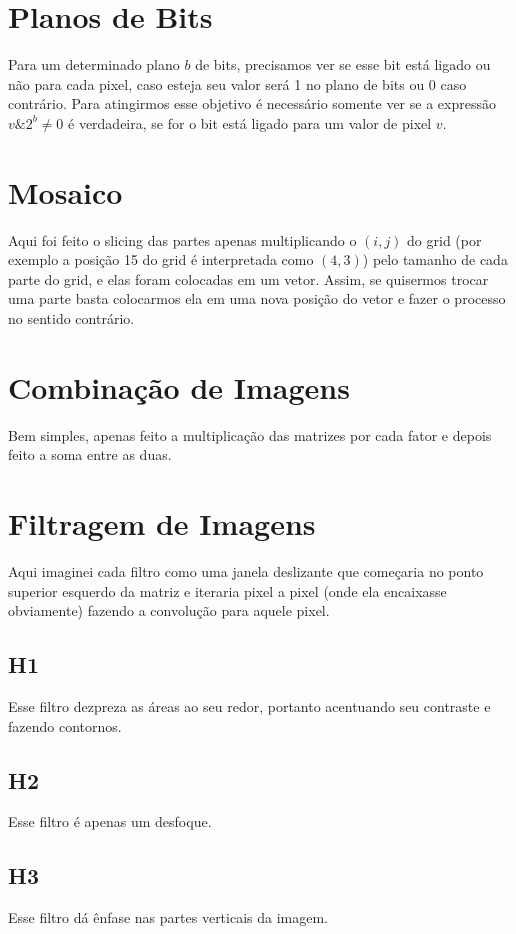 \documentclass[12pt, letterpaper]{article}
\begin{document}
\section{Planos de Bits}
	Para um determinado plano $b$ de bits, precisamos ver se esse bit está ligado ou não para cada pixel, caso esteja seu valor será 1 no plano de bits ou 0 caso contrário. Para atingirmos esse objetivo é necessário somente ver se a expressão $v\&2^b \neq 0$ é verdadeira, se for o bit está ligado para um valor de pixel $v$.

\section{Mosaico}
	Aqui foi feito o slicing das partes apenas multiplicando o $(i, j)$ do grid (por exemplo a posição 15 do grid é interpretada como $(4, 3)$) pelo tamanho de cada parte do grid, e elas foram colocadas em um vetor. Assim, se quisermos trocar uma parte basta colocarmos ela em uma nova posição do vetor e fazer o processo no sentido contrário.

\section{Combinação de Imagens}
	Bem simples, apenas feito a multiplicação das matrizes por cada fator e depois feito a soma entre as duas.

\section{Filtragem de Imagens}
	Aqui imaginei cada filtro como uma janela deslizante que começaria no ponto superior esquerdo da matriz e iteraria pixel a pixel (onde ela encaixasse obviamente) fazendo a convolução para aquele pixel.

	\subsection{H1}
		Esse filtro dezpreza as áreas ao seu redor, portanto acentuando seu contraste e fazendo contornos.
	\subsection{H2}
		Esse filtro é apenas um desfoque.
	\subsection{H3}
		Esse filtro dá ênfase nas partes verticais da imagem.
\end{document}
